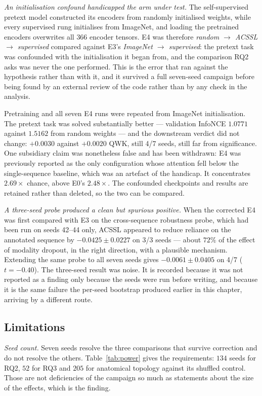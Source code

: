 \documentclass[12pt,a4paper]{report}
\begin{document}
\emph{An initialisation confound handicapped the arm under test.} The
self-supervised pretext model constructed its encoders from randomly initialised
weights, while every supervised rung initialises from ImageNet, and loading the
pretrained encoders overwrites all $366$ encoder tensors. E4 was therefore
\emph{random $\rightarrow$ ACSSL $\rightarrow$ supervised} compared against E3's
\emph{ImageNet $\rightarrow$ supervised}: the pretext task was confounded with
the initialisation it began from, and the comparison RQ2 asks was never the one
performed. This is the error that ran against the hypothesis rather than with
it, and it survived a full seven-seed campaign before being found by an external
review of the code rather than by any check in the analysis.

Pretraining and all seven E4 runs were repeated from ImageNet initialisation.
The pretext task was solved substantially better --- validation InfoNCE $1.0771$
against $1.5162$ from random weights --- and the downstream verdict did not
change: $+0.0030$ against $+0.0020$ QWK, still 4/7 seeds, still far from
significance. One subsidiary claim was nonetheless false and has been withdrawn:
E4 was previously reported as the only configuration whose attention fell below
the single-sequence baseline, which was an artefact of the handicap. It
concentrates $2.69\times$ chance, above E0's $2.48\times$. The confounded
checkpoints and results are retained rather than deleted, so the two can be
compared.

\emph{A three-seed probe produced a clean but spurious positive.} When the
corrected E4 was first compared with E3 on the cross-sequence robustness probe,
which had been run on seeds 42--44 only, ACSSL appeared to reduce reliance on
the annotated sequence by $-0.0425 \pm 0.0227$ on 3/3 seeds --- about $72\%$ of
the effect of modality dropout, in the right direction, with a plausible
mechanism. Extending the same probe to all seven seeds gives
$-0.0061 \pm 0.0405$ on 4/7 ($t = -0.40$). The three-seed result was noise. It
is recorded because it was not reported as a finding only because the seeds were
run before writing, and because it is the same failure the per-seed bootstrap
produced earlier in this chapter, arriving by a different route.

\subsection{Limitations}

\emph{Seed count.} Seven seeds resolve the three comparisons that survive
correction and do not resolve the others. Table~\ref{tab:power} gives the
requirements: $134$ seeds for RQ2, $52$ for RQ3 and $205$ for anatomical
topology against its shuffled control. Those are not deficiencies of the
campaign so much as statements about the size of the effects, which is the
finding.
\end{document}

